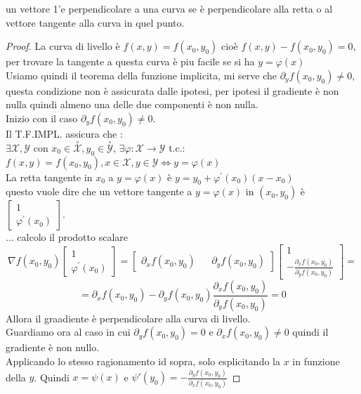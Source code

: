 \observation
un vettore 1'e perpendicolare a una curva se è perpendicolare alla retta o al vettore tangente alla curva in quel punto.
\begin{proof}
	La curva di livello è $f(x,y)=f(x_0,y_0)$ cioè $f(x,y)-f(x_0,y_0)=0$, per trovare la tangente a questa curva è piu facile se si ha $y=\varphi(x)$\\
	Usiamo quindi il teorema della funzione implicita, mi serve che $\partial_yf(x_0,y_0)\ne 0$, questa condizione non è assicurata dalle ipotesi, per ipotesi il gradiente è non nulla quindi almeno una delle due componenti è non nulla.\\
	Inizio con il caso $\partial_yf(x_0,y_0)\ne 0$.\\
	Il T.F.IMPL. assicura che :\\
	$\exists\mathcal{X},\mathcal{Y}$ con $x_0\in\overset{\circ}{\mathcal{X}}, y_0\in\overset{\circ}{\mathcal{Y}}$, $\exists\varphi:\mathcal{X}\rightarrow\mathcal{Y}$ t.c.:\\
	$f(x,y)=f(x_0,y_0), x\in\mathcal{X}, y\in\mathcal{Y} \Leftrightarrow y=\varphi(x)$\\
	La retta tangente in $x_0$ a $y=\varphi(x)$ è $y=y_0+\varphi^{'}(x_0)(x-x_0)$\\
	questo vuole dire che un vettore tangente a $y=\varphi(x)$ in $(x_0,y_0)$ è $\begin{bmatrix}1\\\varphi^{'}(x_0)\end{bmatrix}$.\\
	... calcolo il prodotto scalare\\
	$$\nabla f(x_0,y_0)\begin{bmatrix}1\\\varphi^{'}(x_0)\end{bmatrix} = \begin{bmatrix}\partial_x f(x_0,y_0)&&\partial_y f(x_0,y_0)\end{bmatrix}\begin{bmatrix}1\\-\frac{\partial_x f(x_0,y_0)}{\partial_y f(x_0,y_0)}\end{bmatrix} =$$ 
	$$=\partial_x f(x_0,y_0) -\partial_y f(x_0,y_0)\frac{\partial_x f(x_0,y_0)}{\partial_y f(x_0,y_0)}=0$$
	Allora il graadiente è perpendicolare alla curva di livello.\\
	Guardiamo ora al caso in cui $\partial_yf(x_0,y_0)= 0$ e $\partial_xf(x_0,y_0)\ne 0$ quindi il gradiente è non nullo.\\
	Applicando lo stesso ragionamento id sopra, solo esplicitando la $x$ in funzione della $y$. Quindi $x=\psi(x)$ e $\psi{'}(y_0)=-\frac{\partial_y f(x_0,y_0)}{\partial_x f(x_0,y_0)}$
\end{proof}

